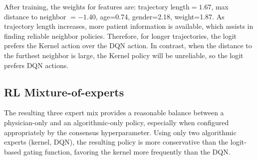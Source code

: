 \documentclass[letterpaper]{article}
\begin{document}


After training, the weights for features are: trajectory length$=1.67$, max distance to neighbor $=-1.40$, age=0.74, gender=2.18, weight=1.87. As trajectory length increases, more patient information is available, which assists in finding reliable neighbor policies. Therefore, for longer trajectories, the logit prefers the Kernel action over the DQN action. In contrast, when the distance to the furthest neighbor is large, the Kernel policy will be unreliable, so the logit prefers DQN actions.

\subsection{RL Mixture-of-experts}

The resulting three expert mix provides a reasonable balance between a physician-only and an
algorithmic-only policy, especially when configured appropriately by the consensus hyperparameter. Using only 
two algorithmic experts (kernel, DQN), the resulting policy is more conservative than the 
logit-based gating function, favoring the kernel more frequently than the DQN.
\end{document}
